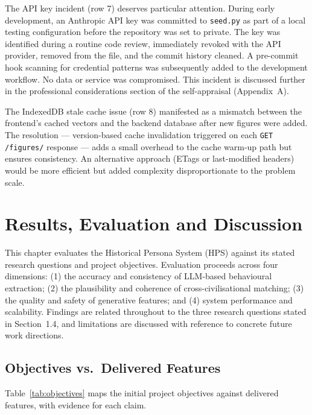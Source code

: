 \documentclass[11pt, a4paper]{report}
\begin{document}
The API key incident (row 7) deserves particular attention. During early development, an Anthropic API key was committed to \texttt{seed.py} as part of a local testing configuration before the repository was set to private. The key was identified during a routine code review, immediately revoked with the API provider, removed from the file, and the commit history cleaned. A pre-commit hook scanning for credential patterns was subsequently added to the development workflow. No data or service was compromised. This incident is discussed further in the professional considerations section of the self-appraisal (Appendix~A).

The IndexedDB stale cache issue (row 8) manifested as a mismatch between the frontend's cached vectors and the backend database after new figures were added. The resolution — version-based cache invalidation triggered on each \texttt{GET /figures/} response — adds a small overhead to the cache warm-up path but ensures consistency. An alternative approach (ETags or last-modified headers) would be more efficient but added complexity disproportionate to the problem scale.

\chapter{Results, Evaluation and Discussion}

This chapter evaluates the Historical Persona System (HPS) against its stated research questions and project objectives. Evaluation proceeds across four dimensions: (1) the accuracy and consistency of LLM-based behavioural extraction; (2) the plausibility and coherence of cross-civilisational matching; (3) the quality and safety of generative features; and (4) system performance and scalability. Findings are related throughout to the three research questions stated in Section~1.4, and limitations are discussed with reference to concrete future work directions.

\section{Objectives vs.\ Delivered Features}

Table~\ref{tab:objectives} maps the initial project objectives against delivered features, with evidence for each claim.
\end{document}
